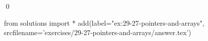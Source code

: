 
\begin{ex}
  \label{ex:29-27-pointers-and-arrays}
  
  \qed
\end{ex}
\begin{python0}
from solutions import *
add(label="ex:29-27-pointers-and-arrays",
    srcfilename='exercises/29-27-pointers-and-arrays/answer.tex')
\end{python0}

